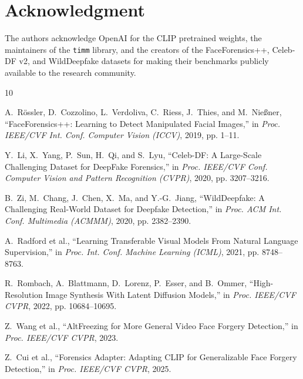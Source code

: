 \documentclass[journal]{IEEEtran}
\begin{document}
\section*{Acknowledgment}

The authors acknowledge OpenAI for the CLIP pretrained weights, the maintainers of the \texttt{timm} library, and the creators of the FaceForensics++, Celeb-DF v2, and WildDeepfake datasets for making their benchmarks publicly available to the research community.

\begin{thebibliography}{10}

A.~Rössler, D.~Cozzolino, L.~Verdoliva, C.~Riess, J.~Thies, and M.~Nießner,
``FaceForensics++: Learning to Detect Manipulated Facial Images,''
in \emph{Proc. IEEE/CVF Int. Conf. Computer Vision (ICCV)}, 2019, pp. 1--11.

Y.~Li, X.~Yang, P.~Sun, H.~Qi, and S.~Lyu,
``Celeb-DF: A Large-Scale Challenging Dataset for DeepFake Forensics,''
in \emph{Proc. IEEE/CVF Conf. Computer Vision and Pattern Recognition (CVPR)}, 2020, pp. 3207--3216.

B.~Zi, M.~Chang, J.~Chen, X.~Ma, and Y.-G.~Jiang,
``WildDeepfake: A Challenging Real-World Dataset for Deepfake Detection,''
in \emph{Proc. ACM Int. Conf. Multimedia (ACMMM)}, 2020, pp. 2382--2390.

A.~Radford et al.,
``Learning Transferable Visual Models From Natural Language Supervision,''
in \emph{Proc. Int. Conf. Machine Learning (ICML)}, 2021, pp. 8748--8763.

R.~Rombach, A.~Blattmann, D.~Lorenz, P.~Esser, and B.~Ommer,
``High-Resolution Image Synthesis With Latent Diffusion Models,''
in \emph{Proc. IEEE/CVF CVPR}, 2022, pp. 10684--10695.

Z.~Wang et al.,
``AltFreezing for More General Video Face Forgery Detection,''
in \emph{Proc. IEEE/CVF CVPR}, 2023.

Z.~Cui et al.,
``Forensics Adapter: Adapting CLIP for Generalizable Face Forgery Detection,''
in \emph{Proc. IEEE/CVF CVPR}, 2025.


\end{thebibliography}
\end{document}
